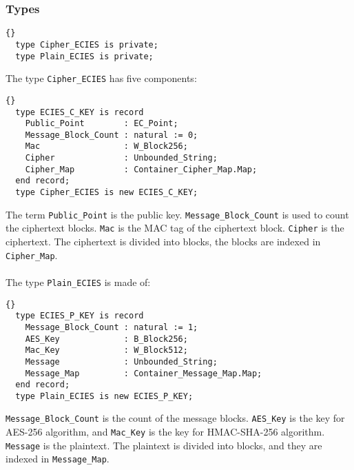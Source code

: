 \subsubsection*{Types}
\begin{lstlisting}{}
  type Cipher_ECIES is private;
  type Plain_ECIES is private;
\end{lstlisting}
The type \texttt{Cipher\_ECIES} has five components:
\begin{lstlisting}{}
  type ECIES_C_KEY is record
    Public_Point        : EC_Point;
    Message_Block_Count : natural := 0;
    Mac                 : W_Block256;
    Cipher              : Unbounded_String;
    Cipher_Map          : Container_Cipher_Map.Map;
  end record;
  type Cipher_ECIES is new ECIES_C_KEY;
\end{lstlisting}
The term \texttt{Public\_Point} is the public
key. \texttt{Message\_Block\_Count} is used to count the ciphertext
blocks. \texttt{Mac} is the MAC tag of the ciphertext
block. \texttt{Cipher} is the ciphertext. The ciphertext is divided
into blocks, the blocks are indexed in
\texttt{Cipher\_Map}.\\ \ \\ The type \texttt{Plain\_ECIES} is made
of:
\begin{lstlisting}{}
  type ECIES_P_KEY is record
    Message_Block_Count : natural := 1;
    AES_Key             : B_Block256;
    Mac_Key             : W_Block512;
    Message             : Unbounded_String;
    Message_Map         : Container_Message_Map.Map;
  end record;
  type Plain_ECIES is new ECIES_P_KEY;
\end{lstlisting}
\texttt{Message\_Block\_Count} is the count of the message
blocks. \texttt{AES\_Key} is the key for AES-256 algorithm, and
\texttt{Mac\_Key} is the key for HMAC-SHA-256
algorithm. \texttt{Message} is the plaintext. The plaintext is divided
into blocks, and they are indexed in \texttt{Message\_Map}.\\
